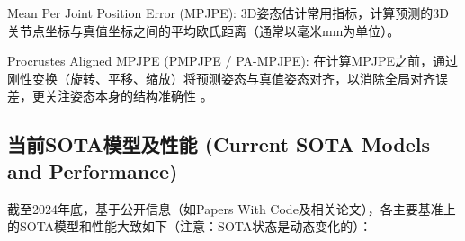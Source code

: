 \documentclass[12pt,a4paper]{article}
\begin{document}
Mean Per Joint Position Error (MPJPE): 3D姿态估计常用指标，计算预测的3D关节点坐标与真值坐标之间的平均欧氏距离（通常以毫米mm为单位）\cite{Li2024Review3DHPE}。 %

Procrustes Aligned MPJPE (PMPJPE / PA-MPJPE): 在计算MPJPE之前，通过刚性变换（旋转、平移、缩放）将预测姿态与真值姿态对齐，以消除全局对齐误差，更关注姿态本身的结构准确性 \cite{Li2024Review3DHPE}。 %

\subsection{当前SOTA模型及性能 (Current SOTA Models and Performance)}
截至2024年底，基于公开信息（如Papers With Code及相关论文），各主要基准上的SOTA模型和性能大致如下（注意：SOTA状态是动态变化的）：
\end{document}
